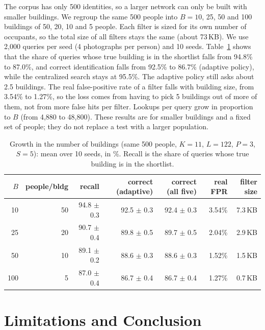 \documentclass[runningheads]{llncs}
\begin{document}
The corpus has only 500 identities, so a larger network can only be built with smaller buildings. We regroup the same
500 people into $B=10$, 25, 50 and 100 buildings of 50, 20, 10 and 5 people. Each filter is sized for its own number
of occupants, so the total size of all filters stays the same (about 73\,KB). We use 2,000 queries per seed (4
photographs per person) and 10 seeds. Table~\ref{tab:scale} shows that the share of queries whose true building is in
the shortlist falls from 94.8\% to 87.0\%, and correct identification falls from 92.5\% to
86.7\% (adaptive policy), while the centralized search stays at 95.5\%. The adaptive policy still asks
about 2.5 buildings. The real false-positive rate of a filter falls with building size, from 3.54\% to
1.27\%, so the loss comes from having to pick 5 buildings out of more of them, not from more false hits per
filter. Lookups per query grow in proportion to $B$ (from 4,880 to 48,800). These results are for smaller buildings
and a fixed set of people; they do not replace a test with a larger population.

\begin{table}[htbp]
\caption{Growth in the number of buildings (same 500 people, $K=11$, $L=122$, $P=3$, $S=5$): mean over 10 seeds, in
\%. Recall is the share of queries whose true building is in the shortlist.}
\label{tab:scale}
\small
\setlength{\tabcolsep}{3.5pt}
\renewcommand{\arraystretch}{1.25}
\begin{tabular}{|r|r|r|r|r|r|r|}
\hline
$B$ & people/bldg & recall & correct (adaptive) & correct (all five) & real FPR & filter size \\
\hline
10 & 50 & 94.8 $\pm$ 0.3 & 92.5 $\pm$ 0.3 & 92.4 $\pm$ 0.3 & 3.54\% & 7.3\,KB \\
25 & 20 & 90.7 $\pm$ 0.4 & 89.8 $\pm$ 0.5 & 89.7 $\pm$ 0.5 & 2.04\% & 2.9\,KB \\
50 & 10 & 89.1 $\pm$ 0.2 & 88.6 $\pm$ 0.3 & 88.6 $\pm$ 0.3 & 1.52\% & 1.5\,KB \\
100 & 5 & 87.0 $\pm$ 0.4 & 86.7 $\pm$ 0.4 & 86.7 $\pm$ 0.4 & 1.27\% & 0.7\,KB \\
\hline
\end{tabular}
\end{table}

\section{Limitations and Conclusion}
\label{sec:limits}
\end{document}
